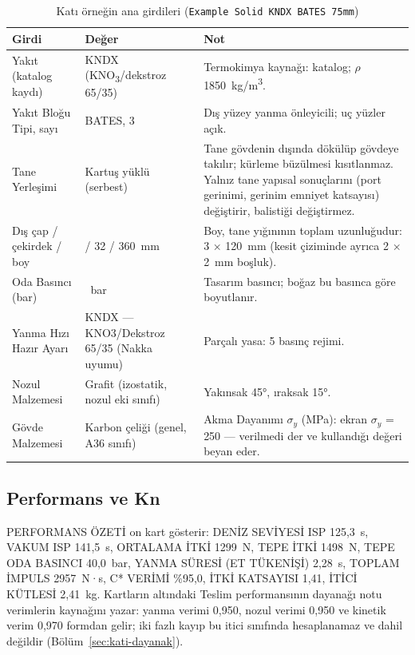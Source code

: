 \documentclass[11pt,a4paper]{article}
\newcommand{\ui}[1]{\textsf{#1}}
\newcommand{\kod}[1]{\texttt{#1}}
\begin{document}
\begin{table}[htbp]
\centering\small
\caption{Katı örneğin ana girdileri (\kod{Example Solid KNDX BATES 75mm})}\label{tab:u2-girdi}
\begin{tabular}{@{}>{\raggedright\arraybackslash}p{5.0cm}>{\raggedright\arraybackslash}p{4.0cm}>{\raggedright\arraybackslash}p{6.6cm}@{}}
\toprule
\textbf{Girdi} & \textbf{Değer} & \textbf{Not} \\
\midrule
\ui{Yakıt (katalog kaydı)} & KNDX (KNO\textsubscript{3}/dekstroz 65/35) & Termokimya kaynağı: katalog; $\rho$ 1850~kg/m\textsuperscript{3}. \\
\ui{Yakıt Bloğu Tipi}, sayı & BATES, 3 & Dış yüzey yanma önleyicili; uç yüzler açık. \\
\ui{Tane Yerleşimi} & \ui{Kartuş yüklü (serbest)} & Tane gövdenin dışında dökülüp gövdeye takılır; kürleme büzülmesi kısıtlanmaz. Yalnız tane yapısal sonuçlarını (port gerinimi, gerinim emniyet katsayısı) değiştirir, balistiği değiştirmez. \\
Dış çap / çekirdek / boy & 75 / 32 / 360~mm & Boy, tane yığınının toplam uzunluğudur: 3 × 120~mm (kesit çiziminde ayrıca 2 × 2~mm boşluk). \\
\ui{Oda Basıncı (bar)} & 40~bar & Tasarım basıncı; boğaz bu basınca göre boyutlanır. \\
\ui{Yanma Hızı Hazır Ayarı} & \ui{KNDX --- KNO3/Dekstroz 65/35 (Nakka uyumu)} & Parçalı yasa: 5 basınç rejimi. \\
\ui{Nozul Malzemesi} & \ui{Grafit (izostatik, nozul eki sınıfı)} & Yakınsak 45°, ıraksak 15°. \\
\ui{Gövde Malzemesi} & \ui{Karbon çeliği (genel, A36 sınıfı)} & \ui{Akma Dayanımı $\sigma_y$ (MPa)}: ekran \ui{$\sigma_y$ = 250 --- verilmedi} der ve kullandığı değeri beyan eder. \\
\bottomrule
\end{tabular}
\end{table}

\subsection{Performans ve Kn}

\ui{PERFORMANS ÖZETİ} on kart gösterir: \ui{DENİZ SEVİYESİ ISP} 125,3~s,
\ui{VAKUM ISP} 141,5~s, \ui{ORTALAMA İTKİ} 1299~N, \ui{TEPE İTKİ} 1498~N,
\ui{TEPE ODA BASINCI} 40,0~bar, \ui{YANMA SÜRESİ (ET TÜKENİŞİ)} 2,28~s,
\ui{TOPLAM İMPULS} 2957~N·s, \ui{C* VERİMİ} \%95,0, \ui{İTKİ KATSAYISI} 1,41,
\ui{İTİCİ KÜTLESİ} 2,41~kg. Kartların altındaki \ui{Teslim performansının
dayanağı} notu verimlerin kaynağını yazar: yanma verimi 0,950, nozul verimi
0,950 ve kinetik verim 0,970 formdan gelir; iki fazlı kayıp bu itici sınıfında
hesaplanamaz ve dahil değildir (Bölüm~\ref{sec:kati-dayanak}).
\end{document}
